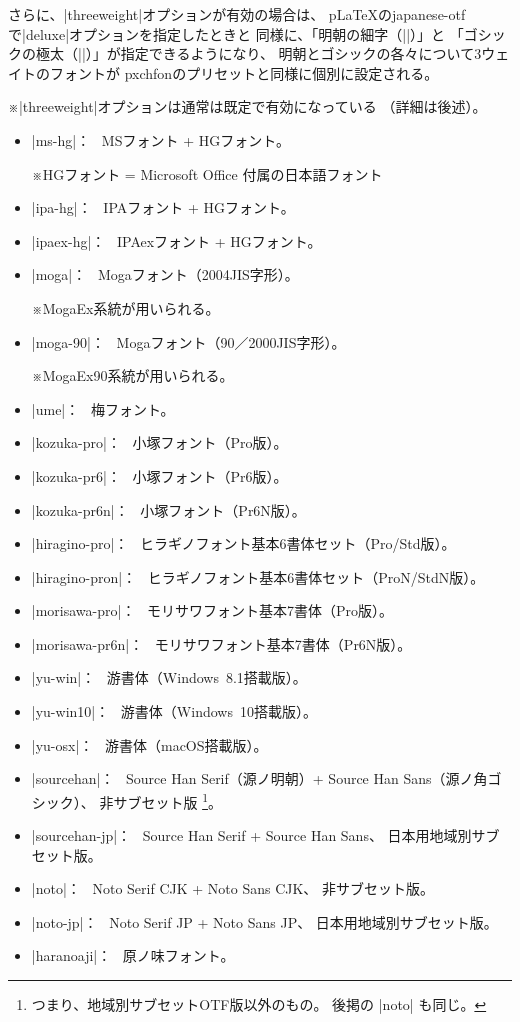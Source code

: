 \documentclass[xelatex,ja=standard,jafont=ipaex,
  a4paper]{bxjsarticle}
\newcommand{\Pkg}[1]{\textsf{#1}}
\newcommand{\Note}{\par\noindent ※}
\newcommand{\Means}{：\ }
\newcommand{\JSl}{\mbox{／}\linebreak[0]}
\begin{document}
さらに、|threeweight|\>オプションが有効の場合は、
{p\LaTeX}\>の\Pkg{japanese-otf}で\>|deluxe|\>オプションを指定したときと
同様に、「明朝の細字（|\rmfamily\ltseries|）」と
「ゴシックの極太（|\sffamily\ebseries|）」が指定できるようになり、
明朝とゴシックの各々について3ウェイトのフォントが
\Pkg{pxchfon}のプリセットと同様に個別に設定される。
\Note |threeweight|\>オプションは通常は既定で有効になっている
（詳細は後述）。

\begin{itemize}
\item |ms-hg|\Means
  MSフォント + HGフォント。
  \Note HGフォント = Microsoft Office 付属の日本語フォント
\item |ipa-hg|\Means
  IPAフォント + HGフォント。
\item |ipaex-hg|\Means
  IPAexフォント + HGフォント。
\item |moga|\Means
  Mogaフォント（2004JIS字形）。
  \Note MogaEx系統が用いられる。
\item |moga-90|\Means
  Mogaフォント（90\JSl 2000JIS字形）。
  \Note MogaEx90系統が用いられる。
\item |ume|\Means
  梅フォント。
\item |kozuka-pro|\Means
  小塚フォント（Pro版）。
\item |kozuka-pr6|\Means
  小塚フォント（Pr6版）。
\item |kozuka-pr6n|\Means
  小塚フォント（Pr6N版）。
\item |hiragino-pro|\Means
  ヒラギノフォント基本6書体セット（Pro/Std版）。
\item |hiragino-pron|\Means
  ヒラギノフォント基本6書体セット（ProN/StdN版）。
\item |morisawa-pro|\Means
  モリサワフォント基本7書体（Pro版）。
\item |morisawa-pr6n|\Means
  モリサワフォント基本7書体（Pr6N版）。
\item |yu-win|\Means
  游書体（Windows~8.1搭載版）。
\item |yu-win10|\Means
  游書体（Windows~10搭載版）。%
\item |yu-osx|\Means
  游書体（macOS搭載版）。
\item |sourcehan|\Means
  Source Han Serif（源ノ明朝）+ Source Han Sans（源ノ角ゴシック）、
  非サブセット版%
  \footnote{つまり、地域別サブセットOTF版以外のもの。
    後掲の |noto| も同じ。}。
\item |sourcehan-jp|\Means
  Source Han Serif + Source Han Sans、
  日本用地域別サブセット版。
\item |noto|\Means
  Noto Serif CJK + Noto Sans CJK、
  非サブセット版。
\item |noto-jp|\Means
  Noto Serif JP + Noto Sans JP、
  日本用地域別サブセット版。
\item |haranoaji|\Means
  原ノ味フォント。
\end{itemize}
\end{document}
